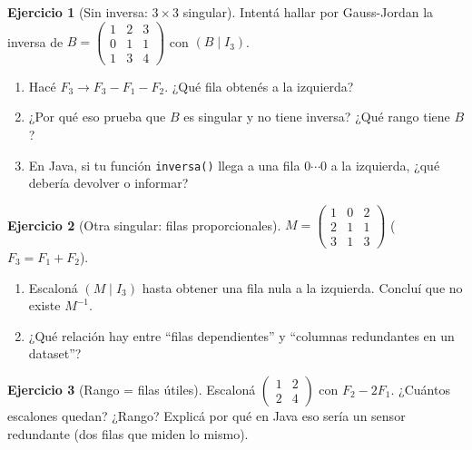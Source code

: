 \documentclass[a4paper,12pt]{article}
\theoremstyle{definition}
\newtheorem{ejercicio}{Ejercicio}[section]
\begin{document}
\begin{ejercicio}[Sin inversa: $3 \times 3$ singular]
Intentá hallar por Gauss-Jordan la inversa de $B=\begin{pmatrix} 1 & 2 & 3 \\ 0 & 1 & 1 \\ 1 & 3 & 4 \end{pmatrix}$ con $(B\mid I_3)$.
\begin{enumerate}[label=\alph*)]
\item Hacé $F_3 \to F_3-F_1-F_2$. ¿Qué fila obtenés a la izquierda?
\item ¿Por qué eso prueba que $B$ es singular y no tiene inversa? ¿Qué rango tiene $B$?
\item En Java, si tu función \texttt{inversa()} llega a una fila $0\cdots 0$ a la izquierda, ¿qué debería devolver o informar?
\end{enumerate}
\end{ejercicio}

\begin{ejercicio}[Otra singular: filas proporcionales]
$M=\begin{pmatrix} 1 & 0 & 2 \\ 2 & 1 & 1 \\ 3 & 1 & 3 \end{pmatrix}$ ($F_3=F_1+F_2$).
\begin{enumerate}[label=\alph*)]
\item Escaloná $(M\mid I_3)$ hasta obtener una fila nula a la izquierda. Concluí que no existe $M^{-1}$.
\item ¿Qué relación hay entre ``filas dependientes'' y ``columnas redundantes en un dataset''?
\end{enumerate}
\end{ejercicio}

\begin{ejercicio}[Rango = filas útiles]
Escaloná $\begin{pmatrix} 1 & 2 \\ 2 & 4 \end{pmatrix}$ con $F_2-2F_1$. ¿Cuántos escalones quedan? ¿Rango? Explicá por qué en Java eso sería un sensor redundante (dos filas que miden lo mismo).
\end{ejercicio}

\end{document}
